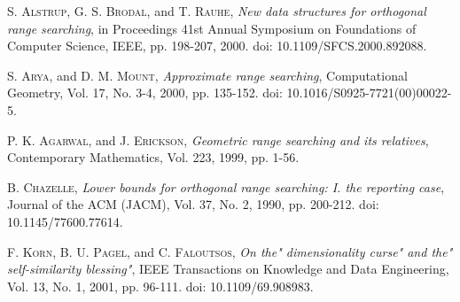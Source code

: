 \documentclass[preprint,12pt]{elsarticle}
\begin{document}
\begin{thebibliography}{00}
 \textsc{S. Alstrup, G. S. Brodal}, and \textsc{T. Rauhe},
\textit{New data structures for orthogonal range searching}, in Proceedings 41st Annual Symposium on Foundations of Computer Science, IEEE, pp. 198-207, 2000. doi: 10.1109/SFCS.2000.892088.

 \textsc{S. Arya}, and \textsc{D. M. Mount},
\textit{Approximate range searching}, Computational Geometry, Vol. 17, No. 3-4, 2000, pp. 135-152. doi: 10.1016/S0925-7721(00)00022-5.

 \textsc{P. K. Agarwal}, and \textsc{J. Erickson},
\textit{Geometric range searching and its relatives}, Contemporary Mathematics, Vol. 223, 1999, pp. 1-56.

 \textsc{B. Chazelle},
\textit{Lower bounds for orthogonal range searching: I. the reporting case}, Journal of the ACM (JACM), Vol. 37, No. 2, 1990, pp. 200-212. doi: 10.1145/77600.77614.

 \textsc{F. Korn, B. U. Pagel}, and \textsc{C. Faloutsos},
\textit{On the" dimensionality curse" and the" self-similarity blessing"}, IEEE Transactions on Knowledge and Data Engineering, Vol. 13, No. 1, 2001, pp. 96-111. doi: 10.1109/69.908983.

\end{thebibliography}
\end{document}
